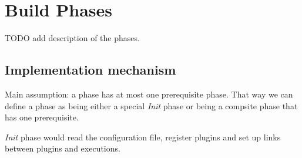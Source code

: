 \documentclass[11pt]{article}
\begin{document}
\section{Build Phases}
TODO add description of the phases.

\subsection{Implementation mechanism}
Main assumption: a phase has at most one prerequisite phase. That way we can
define a phase as being either a special \textit{Init} phase or being a
compsite phase that has one prerequisite.

\textit{Init} phase would read the configuration file, register plugins and set
up links between plugins and executions.
\end{document}
